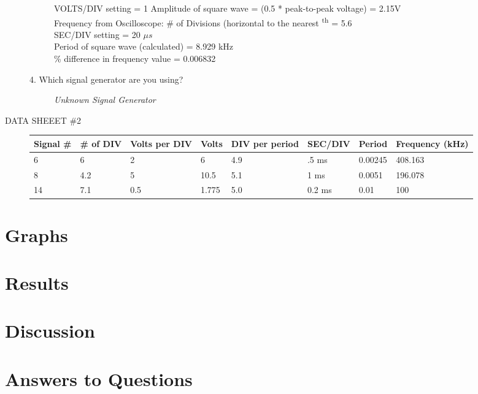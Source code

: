 \documentclass{article}
\begin{document}
\begin{description}
\begin{description}
VOLTS/DIV setting = 1
Amplitude of square wave = (0.5 * peak-to-peak voltage) = 2.15V \\
Frequency from Oscilloscope: \# of Divisions (horizontal to the nearest \textsuperscript{th} = 5.6 \\
SEC/DIV setting = 20 $\mu s$ \\
Period of square wave (calculated) = 8.929 kHz \\
\% difference in frequency value  = 0.006832 
\item[4. Which signal generator are you using?] {\it{Unknown Signal Generator}}
\end{description}
\newpage
\item[DATA SHEEET \#2] \hfill
{\small{
\begin{center}
	\begin{tabular}{| l | l | l | l | l | l | l | l |}
		\hline
		Signal \# &  \# of DIV & Volts per DIV & Volts & DIV per period & SEC/DIV & Period & Frequency (kHz)\\ \hline
		6 & 6 & 2 & 6 & 4.9 & .5 ms & 0.00245 & 408.163 \\ \hline
		8 & 4.2 & 5 & 10.5 & 5.1 & 1 ms & 0.0051 & 196.078 \\ \hline
		14 & 7.1 & 0.5  & 1.775 & 5.0 & 0.2 ms & 0.01 & 100 \\
		\hline
	\end{tabular}
\end{center}
}}
\end{description}
\section{Graphs}
\section{Results}
\section{Discussion}
\section{Answers to Questions}
\end{document}
